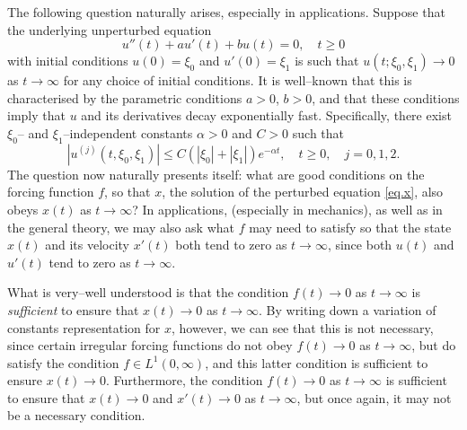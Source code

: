 \documentclass[10pt,reqno]{amsart}
\theoremstyle{definition}
\begin{document}
	The following question naturally arises, especially in applications. Suppose that the underlying unperturbed equation 
	\begin{equation} \label{eq.u}
		u''(t)+au'(t)+bu(t)=0, \quad t\geq 0	
	\end{equation}
	with initial conditions $u(0)=\xi_0$ and $u'(0)=\xi_1$ is such that 
	$u(t;\xi_0,\xi_1)\to 0$ as $t \to\infty$ for any choice of initial conditions. It is well--known that this is characterised by the parametric conditions $a>0$, $b>0$, and that these conditions imply that $u$ and its derivatives decay exponentially fast. Specifically, there exist $\xi_0$-- and $\xi_1$--independent constants  $\alpha>0$ and $C>0$ such that 
	\[
	|u^{(j)}(t,\xi_0,\xi_1)|\leq C(|\xi_0|+|\xi_1|)e^{-\alpha t}, \quad t\geq 0, \quad j=0,1,2.
	\] 
	The question now naturally presents itself: what are good conditions on the forcing function $f$, so that $x$, the solution of the perturbed equation \eqref{eq.x}, also obeys $x(t)$ as $t\to\infty$? In applications, (especially in mechanics), as well as in the general theory, we may also ask what $f$ may need to satisfy so that the state $x(t)$ and its velocity $x'(t)$ both tend to zero as $t\to\infty$, since both $u(t)$ and $u'(t)$ tend to zero as $t\to\infty$. 
	
	What is very--well understood is that the condition $f(t)\to 0$ as $t\to\infty$ is \textit{sufficient} to ensure that $x(t)\to 0$ as $t\to\infty$. By writing down a variation of constants representation for $x$, however, we can see that this is not necessary, since certain irregular forcing functions do not obey $f(t)\to 0$ as $t\to\infty$, but do satisfy the condition $f\in L^1(0,\infty)$, and this latter condition is sufficient to ensure $x(t)\to 0$. Furthermore, the condition $f(t)\to 0$ as $t\to\infty$ is sufficient to ensure that $x(t)\to 0$ and $x'(t)\to 0$ as $t\to\infty$, but once again, it may not be a necessary condition. 
	
\end{document}
